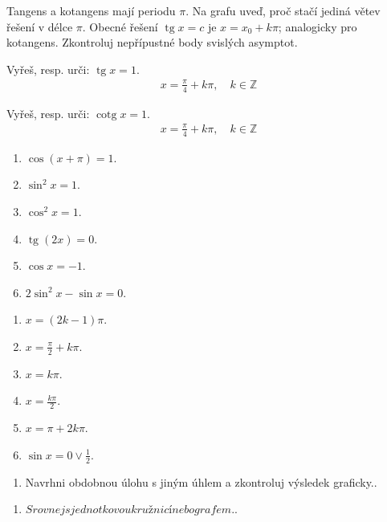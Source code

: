 \documentclass[11pt,a4paper]{article}
\begin{document}
Tangens a kotangens mají periodu $\pi$. Na grafu uveď, proč stačí jediná větev řešení v délce $\pi$.
Obecné řešení $\operatorname{tg}x=c$ je $x=x_0+k\pi$; analogicky pro kotangens. Zkontroluj nepřípustné body svislých asymptot.
\begin{prikladReseniBox}[title={Příklad 1}]
Vyřeš, resp. urči: $\operatorname{tg}x=1$.
\tcblower
\[\begin{aligned}x=\frac{\pi}{4}+k\pi,\quad k\in\mathbb Z\end{aligned}\]
\end{prikladReseniBox}
\begin{prikladReseniBox}[title={Příklad 2}]
Vyřeš, resp. urči: $\operatorname{cotg}x=1$.
\tcblower
\[\begin{aligned}x=\frac{\pi}{4}+k\pi,\quad k\in\mathbb Z\end{aligned}\]
\end{prikladReseniBox}
\begin{zadaniReseniBox}[title={Samostatná práce 1}]
\begin{enumerate}[label=\alph*)]
\item $\cos(x+\pi)=1$.
\item $\sin^2x=1$.
\item $\cos^2x=1$.
\item $\operatorname{tg}(2x)=0$.
\item $\cos x=-1$.
\item $2\sin^2x-\sin x=0$.
\end{enumerate}
\tcblower
\begin{enumerate}[label=\alph*)]
\item $x=(2k-1)\pi$.
\item $x=\frac{\pi}{2}+k\pi$.
\item $x=k\pi$.
\item $x=\frac{k\pi}{2}$.
\item $x=\pi+2k\pi$.
\item $\sin x=0\lor\frac{1}{2}$.
\end{enumerate}
\end{zadaniReseniBox}
\begin{zadaniReseniBox}[title={Rozšíření 1}]
\begin{enumerate}[label=\alph*)]
\item Navrhni obdobnou úlohu s jiným úhlem a zkontroluj výsledek graficky..
\end{enumerate}
\tcblower
\begin{enumerate}[label=\alph*)]
\item $Srovnej s jednotkovou kružnicí nebo grafem.$.
\end{enumerate}
\end{zadaniReseniBox}
\end{document}

